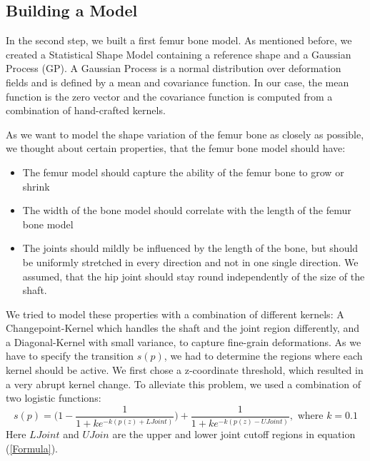 \documentclass{article} %
\begin{document}
\subsection{Building a Model}
In the second step, we built a first femur bone model. As mentioned before, we created a Statistical Shape Model containing a reference shape and a Gaussian Process (GP). A Gaussian Process is a normal distribution over deformation fields and is defined by a mean and covariance function. In our case, the mean function is the zero vector and the covariance function is computed from a combination of hand-crafted kernels.\par
As we want to model the shape variation of the femur bone as closely as possible, we thought about certain properties, that the femur bone model should have:
\begin{itemize}
\item The femur model should capture the ability of the femur bone to grow or shrink
\item The width of the bone model should correlate with the length of the femur bone model
\item The joints should mildly be influenced by the length of the bone, but should be uniformly stretched in every direction and not in one single direction. We assumed, that the hip joint should stay round independently of the size of the shaft.
\end{itemize}
We tried to model these properties with a combination of different kernels: A Changepoint-Kernel which handles the shaft and the joint region differently, and a Diagonal-Kernel with small variance, to capture fine-grain deformations. As we have to specify the transition $s(p)$, we had to determine the regions where each kernel should be active. We first chose a z-coordinate threshold, which resulted in a very abrupt kernel change. To alleviate this problem, we used a combination of two logistic functions:
\begin{equation}
\label{Formula}
s(p) = \Big(1 - \frac{1}{1+ke^{-k(p(z) + \textit{LJoint})}}\Big) + \frac{1}{1+ke^{-k(p(z) - \textit{UJoint})}}, \text{ where } k = 0.1 
\end{equation}
Here $\textit{LJoint}$ and $\textit{UJoin}$ are the upper and lower joint cutoff regions in equation (\ref{Formula}).
\end{document}
